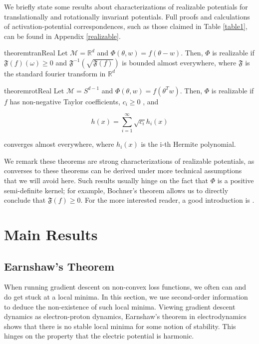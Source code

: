 \documentclass[11pt]{article}
\newcommand{\R}{{\mathbb{R}}}
\begin{document}
We briefly state some results about characterizations of realizable potentials for translationally and rotationally invariant potentials. Full proofs and calculations of activation-potential correspondences, such as those claimed in Table \ref{table1}, can be found in Appendix \ref{realizable}.
 
\begin{restatable}{theorem}{tranReal}
\label{thm:tranReal}
Let $\mathcal{M} = \R^d$ and $\Phi(\theta,w) = f(\theta - w)$. Then, $\Phi$ is realizable if $\mathfrak{F}(f)(\omega) \geq 0$ and $\mathfrak{F}^{-1}(\sqrt{\mathfrak{F}(f)})$ is bounded almost everywhere, where $\mathfrak{F}$ is the standard fourier transform in $\R^d$
\end{restatable}




\begin{restatable}{theorem}{rotReal}
\label{thm:rotReal}
Let $\mathcal{M} = S^{d-1}$ and $\Phi(\theta,w) = f(\theta^Tw)$. Then, $\Phi$ is realizable if $f$ has non-negative Taylor coefficients, $c_i \geq 0$ , and 

\[h(x) = \sum_{i=1}^\infty \sqrt{c_i} h_i(x)\]

converges almost everywhere, where $h_i(x)$ is the i-th Hermite polynomial.
\end{restatable}

We remark these theorems are strong characterizations of realizable potentials, as converses to these theorems can be derived under more technical assumptions that we will avoid here. Such results usually hinge on the fact that $\Phi$ is a positive semi-definite kernel; for example, Bochner's theorem allows us to directly conclude that $\mathfrak{F}(f) \geq 0$. For the more interested reader, a good introduction is \cite{Fasshauer_positivedefinite}. 


\section{Main Results} 

\subsection{Earnshaw's Theorem}

When running gradient descent on non-convex loss functions, we often can and do get stuck at a local minima. In this section, we use second-order information to deduce the non-existence of such local minima. Viewing gradient descent dynamics as electron-proton dynamics, Earnshaw's theorem in electrodynamics shows that there is no stable local minima for some notion of stability. This hinges on the property that the electric potential is harmonic. 
\end{document}

